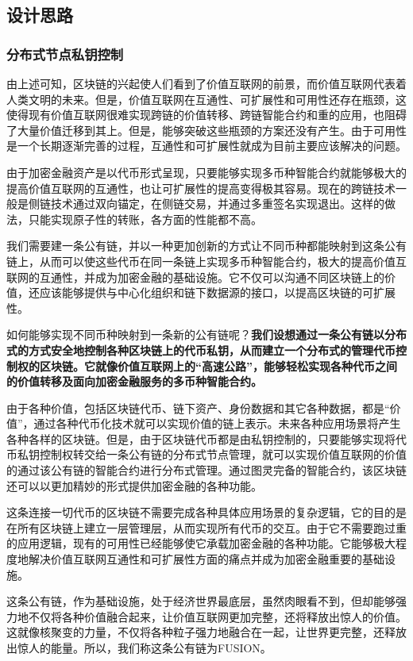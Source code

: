 \documentclass[a4paper,12pt]{article}
\begin{document}
\subsection{设计思路}

\subsubsection{分布式节点私钥控制}

由上述可知，区块链的兴起使人们看到了价值互联网的前景，而价值互联网代表着人类文明的未来。但是，价值互联网在互通性、可扩展性和可用性还存在瓶颈，这使得现有价值互联网很难实现跨链的价值转移、跨链智能合约和重的应用，也阻碍了大量价值迁移到其上。但是，能够突破这些瓶颈的方案还没有产生。由于可用性是一个长期逐渐完善的过程，互通性和可扩展性就成为目前主要应该解决的问题。

由于加密金融资产是以代币形式呈现，只要能够实现多币种智能合约就能够极大的提高价值互联网的互通性，也让可扩展性的提高变得极其容易。现在的跨链技术一般是侧链技术通过双向锚定，在侧链交易，并通过多重签名实现退出。这样的做法，只能实现原子性的转账，各方面的性能都不高。

我们需要建一条公有链，并以一种更加创新的方式让不同币种都能映射到这条公有链上，从而可以使这些代币在同一条链上实现多币种智能合约，极大的提高价值互联网的互通性，并成为加密金融的基础设施。它不仅可以沟通不同区块链上的价值，还应该能够提供与中心化组织和链下数据源的接口，以提高区块链的可扩展性。

如何能够实现不同币种映射到一条新的公有链呢？\textbf{我们设想通过一条公有链以分布式的方式安全地控制各种区块链上的代币私钥，从而建立一个分布式的管理代币控制权的区块链。它就像价值互联网上的“高速公路”，能够轻松实现各种代币之间的价值转移及面向加密金融服务的多币种智能合约。}

由于各种价值，包括区块链代币、链下资产、身份数据和其它各种数据，都是“价值”，通过各种代币化技术就可以实现价值的链上表示。未来各种应用场景将产生各种各样的区块链。但是，由于区块链代币都是由私钥控制的，只要能够实现将代币私钥控制权转交给一条公有链的分布式节点管理，就可以实现价值互联网的价值的通过该公有链的智能合约进行分布式管理。通过图灵完备的智能合约，该区块链还可以以更加精妙的形式提供加密金融的各种功能。

这条连接一切代币的区块链不需要完成各种具体应用场景的复杂逻辑，它的目的是在所有区块链上建立一层管理层，从而实现所有代币的交互。由于它不需要跑过重的应用逻辑，现有的可用性已经能够使它承载加密金融的各种功能。它能够极大程度地解决价值互联网互通性和可扩展性方面的痛点并成为加密金融重要的基础设施。

这条公有链，作为基础设施，处于经济世界最底层，虽然肉眼看不到，但却能够强力地不仅将各种价值融合起来，让价值互联网更加完整，还将释放出惊人的价值。这就像核聚变的力量，不仅将各种粒子强力地融合在一起，让世界更完整，还释放出惊人的能量。所以，我们称这条公有链为FUSION。
\end{document}
